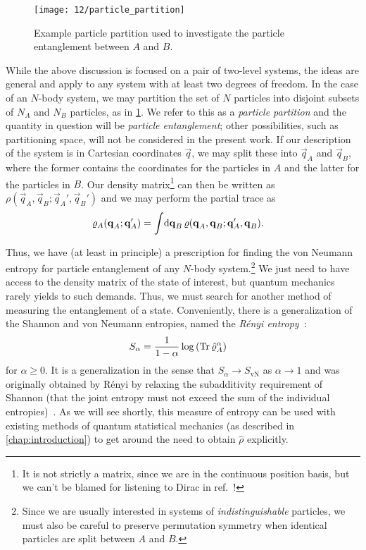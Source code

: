 \begin{figure}
	\centering
	\texttt{[image: 12/particle\_partition]}
	\caption[
		Example particle partition
	]{
		Example particle partition used to investigate the particle entanglement between $A$ and $B$.
	}
	\label{fig:particle-partition}
\end{figure}

While the above discussion is focused on a pair of two-level systems, the ideas are general and apply to any system with at least two degrees of freedom.
In the case of an $N$-body system, we may partition the set of $N$ particles into disjoint subsets of $N_A$ and $N_B$ particles, as in \cref{fig:particle-partition}.
We refer to this as a \emph{particle partition} and the quantity in question will be \emph{particle entanglement}; other possibilities, such as partitioning space, will not be considered in the present work.
If our description of the system is in Cartesian coordinates $\vec{q}$, we may split these into $\vec{q}_A$ and $\vec{q}_B$, where the former contains the coordinates for the particles in $A$ and the latter for the particles in $B$.
Our density matrix\footnote{
	It is not strictly a matrix, since we are in the continuous position basis, but we can't be blamed for listening to Dirac in ref.~\cite[69-70]{dirac1981principles}!
} can then be written as $\rho(\vec{q}_A, \vec{q}_B ; \vec{q}_A', \vec{q}_B')$ and we may perform the partial trace as
\begin{align}
	\rho_A(\vec{q}_A ; \vec{q}_A')
	&= \int\! \dif \vec{q}_B \, \rho(\vec{q}_A, \vec{q}_B ; \vec{q}_A', \vec{q}_B).
\end{align}

Thus, we have (at least in principle) a prescription for finding the von Neumann entropy for particle entanglement of any $N$-body system.\footnote{
	Since we are usually interested in systems of \emph{indistinguishable} particles, we must also be careful to preserve permutation symmetry when identical particles are split between $A$ and $B$.
}
We just need to have access to the density matrix of the state of interest, but quantum mechanics rarely yields to such demands.
Thus, we must search for another method of measuring the entanglement of a state.
Conveniently, there is a generalization of the Shannon and von Neumann entropies, named the \emph{Rényi entropy}~\cite{herdman2014path,renyi1961measures}:
\begin{align}
	S_\alpha
	&= \frac{1}{1 - \alpha} \log{\left( \operatorname{Tr}{\hat{\varrho}_A^\alpha} \right)}
\end{align}
for $\alpha \ge 0$.
It is a generalization in the sense that $S_\alpha \to S_\mathrm{vN}$ as $\alpha \to 1$ and was originally obtained by Rényi by relaxing the subadditivity requirement of Shannon (that the joint entropy must not exceed the sum of the individual entropies)~\cite{shannon1948mathematical,renyi1961measures}.
As we will see shortly, this measure of entropy can be used with existing methods of quantum statistical mechanics (as described in \cref{chap:introduction}) to get around the need to obtain $\hat{\rho}$ explicitly.






